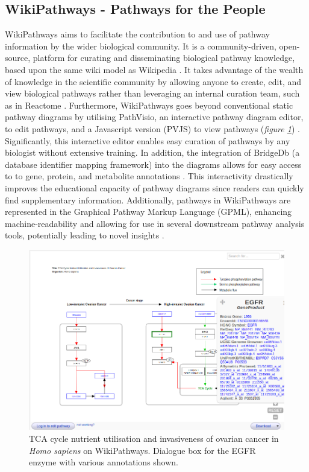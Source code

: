 \documentclass[a4paper,12pt,twoside]{apa}
\begin{document}
\subsection{WikiPathways - Pathways for the People}

WikiPathways aims to facilitate the contribution to and use of pathway information by the wider biological community. It is a community-driven, open-source, platform for curating and disseminating biological pathway knowledge, based upon the same wiki model as Wikipedia \cite{pico2008wikipathways}. It takes advantage of the wealth of knowledge in the scientific community by allowing anyone to create, edit, and view biological pathways rather than leveraging an internal curation team, such as in Reactome \cite{joshi2005reactome}. Furthermore, WikiPathways goes beyond conventional static pathway diagrams by utilising PathVisio, an interactive pathway diagram editor, to edit pathways, and a Javascript version (PVJS) to view pathways (\textit{figure \ref{pathway:homo-sapiens-ovarian-cancer}}) \cite{kutmon2015pathvisio}. Significantly, this interactive editor enables easy curation of pathways by any biologist without extensive training. In addition, the integration of BridgeDb (a database identifier mapping framework) into the diagrams allows for easy access to to gene, protein, and metabolite annotations \cite{van2010bridgedb, kelder2012wikipathways}. This interactivity drastically improves the educational capacity of pathway diagrams since readers can quickly find supplementary information. Additionally, pathways in WikiPathways are represented in the Graphical Pathway Markup Language (GPML), enhancing machine-readability and allowing for use in several downstream pathway analysis tools, potentially leading to novel insights \cite{kelder2012wikipathways}.

\begin{figure}[h]
  \centering
  \includegraphics[scale=0.5]{figures/homo-sapiens-ovarian-cancer.png}
  \caption{TCA cycle nutrient utilisation and invasiveness of ovarian cancer in \textit{Homo sapiens} on WikiPathways. Dialogue box for the EGFR enzyme with various annotations shown.}
  \label{pathway:homo-sapiens-ovarian-cancer}
\end{figure}
\end{document}
